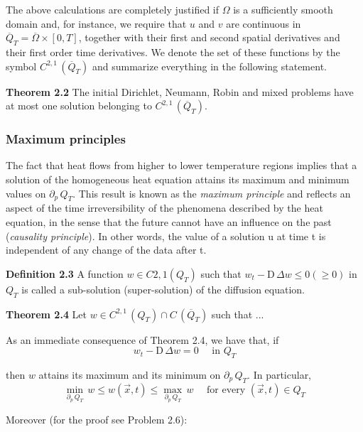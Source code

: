 \documentclass[../main.tex]{subfiles}
\begin{document}
The above calculations are completely justified if $\Omega$ is a sufficiently smooth domain and, for instance, we require that $u$ and $v$ are continuous in $\overline{Q}_T = \overline{\Omega} \times [0,T]$, together with their first and second spatial derivatives and their first order time
derivatives. We denote the set of these functions by the symbol $C^{2,1} \, (\overline{Q}_T)$ and summarize everything in the following statement.

\textbf{Theorem 2.2}  The initial Dirichlet, Neumann, Robin and mixed problems have at most one solution belonging to $C^{2,1} \, (\overline{Q}_T)$.

\subsubsection{Maximum principles}

The fact that heat flows from higher to lower temperature regions implies that a solution of the homogeneous heat equation attains its maximum and minimum values on $\partial_p \, Q_T$. This result is known as the \textit{maximum principle} and reflects an aspect of the time irreversibility of the phenomena described by the heat equation, in the sense that the future cannot have an influence on the past (\textit{causality principle}). In other words, the value of a solution u at time t is independent of any change of the data after t.

\textbf{Definition 2.3}  A function $w \in C{2,1} (Q_T)$ such that $w_t − \mathrm{D} \, \Delta w \leqslant 0 (\geqslant 0)$ in $Q_T$ is called a sub-solution (super-solution) of the diffusion equation.

\textbf{Theorem 2.4}  Let $w \in C^{2,1} \, (Q_T) \cap C \, (\overline{Q}_T)$ such that ...

As an immediate consequence of Theorem 2.4, we have that, if
\begin{equation}
    w_t - \mathrm{D} \, \Delta w = 0 \quad \text{ in } Q_T
\end{equation}

then $w$ attains its maximum and its minimum on $\partial_p \, Q_T$. In particular,
\begin{equation}
    \min_{\partial_p \, Q_T} \, w \leqslant w(\vec{x}, t) \leqslant \max_{\partial_p \, Q_T} \, w \quad \text{ for every }(\vec{x},t) \in Q_T
\end{equation}

Moreover (for the proof see Problem 2.6):
\end{document}
